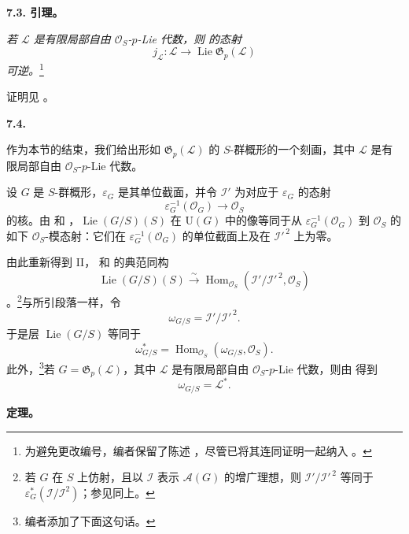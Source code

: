 \medskip
\noindent\textbf{7.3. 引理。}
\label{sga3:VIIA:7.3}

\textit{若 \(\mathcal L\) 是有限局部自由 \(\mathcal O_S\)-\(p\)-Lie 代数，则  的态射}
\[
  j_{\mathcal L}:
  \mathcal L
  \longrightarrow
  \operatorname{Lie}\mathfrak G_p(\mathcal L)
\]
\textit{可逆。}\footnote{为避免更改编号，编者保留了陈述 ，尽管已将其连同证明一起纳入 。}

证明见 。

\medskip
\noindent\textbf{7.4.}
\label{sga3:VIIA:7.4}

作为本节的结束，我们给出形如 \(\mathfrak G_p(\mathcal L)\) 的 \(S\)-群概形的一个刻画，其中 \(\mathcal L\) 是有限局部自由 \(\mathcal O_S\)-\(p\)-Lie 代数。

设 \(G\) 是 \(S\)-群概形，\(\varepsilon_G\) 是其单位截面，并令 \(\mathcal I'\) 为对应于 \(\varepsilon_G\) 的态射
\[
  \varepsilon_G^{-1}(\mathcal O_G)
  \longrightarrow
  \mathcal O_S
\]
的核。由  和 ，\(\operatorname{Lie}(G/S)(S)\) 在 \(\mathrm U(G)\) 中的像等同于从 \(\varepsilon_G^{-1}(\mathcal O_G)\) 到 \(\mathcal O_S\) 的如下 \(\mathcal O_S\)-模态射：它们在 \(\varepsilon_G^{-1}(\mathcal O_G)\) 的单位截面上及在 \(\mathcal I'^{\,2}\) 上为零。

由此重新得到 II， 和  的典范同构
\[
  \operatorname{Lie}(G/S)(S)
  \xrightarrow{\sim}
  \operatorname{Hom}_{\mathcal O_S}
    (\mathcal I'/\mathcal I'^{\,2},\mathcal O_S)
\]
。\footnote{若 \(G\) 在 \(S\) 上仿射，且以 \(\mathcal I\) 表示 \(\mathcal A(G)\) 的增广理想，则 \(\mathcal I'/\mathcal I'^{\,2}\) 等同于 \(\varepsilon_G^{*}(\mathcal I/\mathcal I^2)\)；参见同上。}与所引段落一样，令
\[
  \omega_{G/S}=\mathcal I'/\mathcal I'^{\,2}.
\]
于是层 \(\operatorname{Lie}(G/S)\) 等同于
\[
  \omega_{G/S}^{*}
  =
  \operatorname{Hom}_{\mathcal O_S}
    (\omega_{G/S},\mathcal O_S).
\]
此外，\footnote{编者添加了下面这句话。}若 \(G=\mathfrak G_p(\mathcal L)\)，其中 \(\mathcal L\) 是有限局部自由 \(\mathcal O_S\)-\(p\)-Lie 代数，则由  得到
\[
  \omega_{G/S}=\mathcal L^{*}.
\]

\medskip
\noindent\textbf{定理。}
\label{sga3:VIIA:7.4-theorem}

